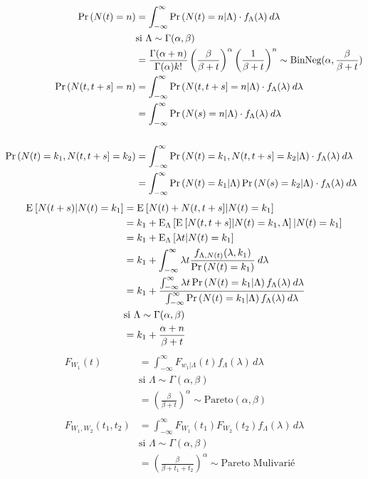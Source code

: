 \begin{align*}
    \prob{N(t) = n} &= \int_{-\infty}^\infty \prob{N(t) = n | \Lambda} \cdot f_\Lambda(\lambda)\: d\lambda \\ 
    &\text{si } \Lambda \sim \Gamma(\alpha, \beta) \\
    &= \frac{\Gamma(\alpha+n)}{\Gamma(\alpha)k!} \left( \frac{\beta}{\beta + t} \right)^\alpha \left( \frac{1}{\beta + t} \right)^n \sim \text{BinNeg}(\alpha, \frac{\beta}{\beta + t})
\\
    \prob{N(t, t+s] = n} &= \int_{-\infty}^\infty \prob{N(t, t+s] = n | \Lambda} \cdot f_\Lambda(\lambda)\: d\lambda \\
    &= \int_{-\infty}^\infty \prob{N(s) = n | \Lambda} \cdot f_\Lambda(\lambda)\: d\lambda 
\\ \\
    \prob{N(t) = k_1, N(t, t+s] = k_2} &= \int_{-\infty}^\infty \prob{N(t) = k_1, N(t, t+s] = k_2| \Lambda} \cdot f_\Lambda(\lambda)\: d\lambda \\
    &= \int_{-\infty}^\infty \prob{N(t) = k_1 | \Lambda} \prob{N(s) = k_2 | \Lambda}\cdot f_\Lambda(\lambda)\: d\lambda
\end{align*}
\begin{align*}
    \esp{N(t+s)|N(t) = k_1} &= \esp{N(t) + N(t, t+s] | N(t) = k_1} \\
    &= k_1 + \esp[\Lambda]{\esp{N(t, t+s]|N(t) = k_1, \Lambda}|N(t) = k_1} \\
    &= k_1 + \esp[\Lambda]{\lambda t|N(t) = k_1} \\
    &= k_1 + \int_{-\infty}^\infty \lambda t \frac{f_{\Lambda, N(t)}(\lambda, k_1)}{\prob{N(t) = k_1}}\: d\lambda \\
    &= k_1 + \frac{\int_{-\infty}^\infty\lambda t \prob{N(t) = k_1|\Lambda} f_\Lambda(\lambda)\:d\lambda}{\int_{-\infty}^\infty \prob{N(t) = k_1|\Lambda} f_\Lambda(\lambda)\:d\lambda} \\
    &\text{si } \Lambda \sim \Gamma(\alpha, \beta) \\
    &= k_1 + \frac{\alpha + n}{\beta + t}
\end{align*}
\begin{align*}
    F_{W_1}(t) &= \int_{-\infty}^\infty F_{w_1|\Lambda}(t) f_\Lambda(\lambda)\,d\lambda \\
    &\text{si } \Lambda \sim \Gamma(\alpha, \beta) \\
    &= \left( \frac{\beta}{\beta + t} \right)^\alpha \sim \text{Pareto}(\alpha, \beta)
\\ \\
    F_{W_1, W_2}(t_1, t_2) &= \int_{-\infty}^\infty F_{W_1}(t_1) F_{W_2}(t_2) f_\Lambda(\lambda)\,d\lambda\\
    &\text{si } \Lambda \sim \Gamma(\alpha, \beta) \\
    &= \left( \frac{\beta}{\beta + t_1 + t_2 } \right)^\alpha \sim \text{Pareto Mulivarié}
\end{align*}
